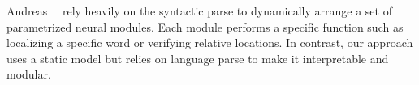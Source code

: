 Andreas~\etal~\cite{andreas2016neural,andreas2016learning} rely heavily
on the syntactic parse to dynamically arrange a set of parametrized neural modules. Each module performs a specific function such as localizing a specific word or verifying relative locations. In contrast, our approach uses a static model but relies on language parse to make it interpretable and modular.  
  
